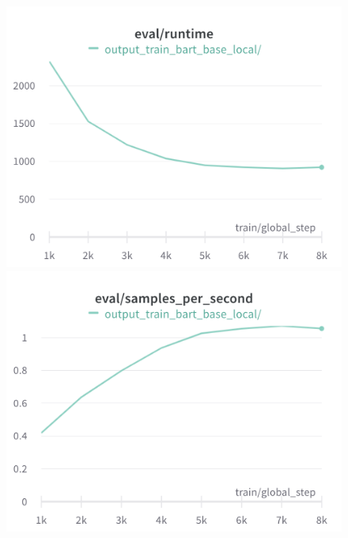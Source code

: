 \documentclass{article}
\begin{document}
\begin{figure}[!htb]
\includegraphics[width=\linewidth]{charts/Section-4-Panel-4-nuos3yp7v}
\caption{}
\endminipage\hfill
{}
\includegraphics[width=\linewidth]{charts/Section-4-Panel-5-noz0rp558}
\caption{}
\endminipage
\end{figure}
\end{document}
